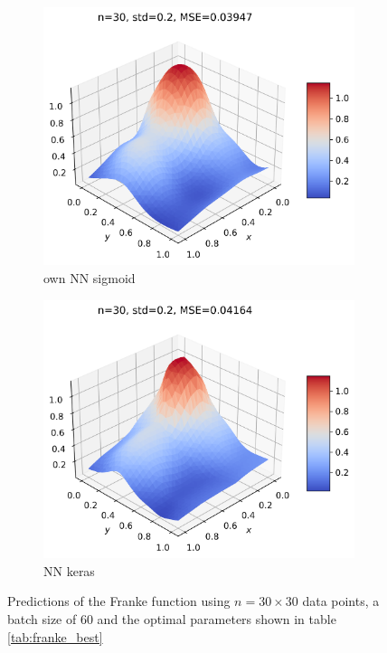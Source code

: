 \documentclass[11pt]{article}
\begin{document}
\begin{figure}[H]
\begin{subfigure}{.5\textwidth}
        \includegraphics[width=.92\textwidth]{../figures/NN_sigmoid_franke.png}
        \caption{own NN sigmoid}
        \label{fig:}
    \end{subfigure}
    \begin{subfigure}{.5\textwidth}
        \centering
        \includegraphics[width=.92\textwidth]{../figures/NN_tf_franke.png}
        \caption{NN keras}
        \label{fig:}
    \end{subfigure}
    \caption{Predictions of the Franke function using $n=30\times 30$ data points, a batch size of 60 and the optimal parameters shown in table \ref{tab:franke_best}}
    \label{fig:franke_pred}
\end{figure}
\end{document}
